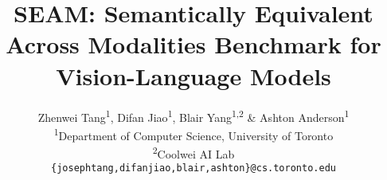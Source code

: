 \documentclass{article} %
\title{SEAM: Semantically Equivalent Across Modalities Benchmark for Vision-Language Models}
\author{Zhenwei Tang\textsuperscript{1}, Difan Jiao\textsuperscript{1}, Blair Yang\textsuperscript{1,2} \& Ashton Anderson\textsuperscript{1} \\
\textsuperscript{1}Department of Computer Science, University of Toronto\\
\textsuperscript{2}Coolwei AI Lab\\
\texttt{\{josephtang,difanjiao,blair,ashton\}@cs.toronto.edu}
}
\begin{document}
\ifcolmsubmission
\linenumbers
\fi

\maketitle

















\end{document}
